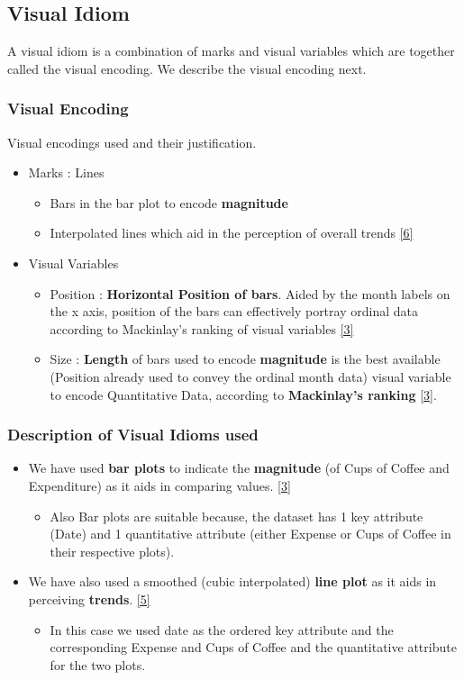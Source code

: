 \documentclass[a4paper,11pt]{article}
\begin{document}
\begin{multicols}{2}
\subsection*{Visual Idiom}
A visual idiom is a combination of marks and visual variables which are together called the visual encoding. We describe the visual encoding next.
\subsubsection*{Visual Encoding}
Visual encodings used and their justification.
\begin{itemize}
	\item Marks : Lines
	\begin{itemize}
		\item Bars in the bar plot to encode \textbf{magnitude}
		\item Interpolated lines which aid in the perception of overall trends \ref{6}
	\end{itemize}	
	\item Visual Variables
	\begin{itemize}
		\item Position : \textbf{Horizontal Position of bars}. Aided by the month labels on the x axis, position of the bars can effectively portray ordinal data according to Mackinlay’s ranking of visual variables \ref{3}
		\item Size : \textbf{Length} of bars used to encode \textbf{magnitude} is the best available (Position already used to convey the ordinal month data) visual variable to encode Quantitative Data, according to  \textbf{Mackinlay’s ranking} \ref{3}.
	\end{itemize}
\end{itemize}
\subsubsection*{Description of Visual Idioms used}
\begin{itemize}
	\item We have used \textbf{bar plots} to indicate the \textbf{magnitude} (of Cups of Coffee and Expenditure) as it aids in comparing values. \ref{3}
	\begin{itemize}
		\item Also Bar plots are suitable because, the dataset has 1 key attribute (Date) and 1 quantitative  attribute (either Expense or Cups of Coffee in their respective plots).
	\end{itemize}
	\item We have also used a smoothed (cubic interpolated) \textbf{line plot} as it aids in perceiving \textbf{trends}. \ref{5}
	\begin{itemize}
		\item In this case we used date as the ordered key attribute and the corresponding Expense and Cups of Coffee and the quantitative attribute for the two plots.
	\end{itemize}
\end{itemize}

\end{multicols}
\end{document}
